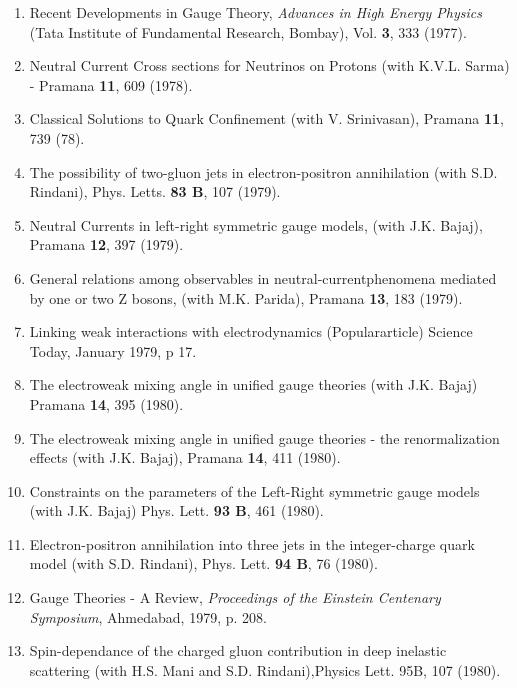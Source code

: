 \begin{enumerate}
\item Recent Developments in Gauge Theory, {\it Advances in High Energy
Physics} (Tata Institute of Fundamental Research, Bombay), 
Vol. {\bf 3}, 333 (1977).

\item Neutral Current Cross sections for Neutrinos on Protons (with
K.V.L. Sarma) - Pramana {\bf 11}, 609 (1978).

\item Classical Solutions to Quark Confinement (with V. Srinivasan), 
Pramana {\bf 11}, 739 (78).

\item The possibility of two-gluon jets in electron-positron
annihilation (with S.D. Rindani), Phys. Letts. {\bf 83 B}, 107 (1979).

\item Neutral Currents in left-right symmetric gauge models, (with J.K.
Bajaj), Pramana {\bf 12}, 397 (1979).

\item General relations among observables in neutral-current\break phenomena
mediated by one or two Z bosons, (with M.K. Parida), Pramana {\bf 13}, 
183 (1979).

\item Linking weak interactions with electrodynamics (Popular\break article)
Science Today, January 1979, p 17.

\item The electroweak mixing angle in unified gauge theories (with J.K.
Bajaj) Pramana {\bf 14}, 395 (1980).

\item The electroweak mixing angle in unified gauge theories - the
renormalization effects (with J.K. Bajaj), Pramana {\bf 14}, 411
(1980).

\item Constraints on the parameters of the Left-Right symme\-tric gauge
models (with J.K. Bajaj) Phys. Lett. {\bf 93 B}, 461 (1980).

\item Electron-positron annihilation into three jets in the
integer-charge quark model (with S.D. Rindani), Phys. Lett. {\bf 94 B}, 
76 (1980).

\item Gauge Theories - A Review, {\it Proceedings of the Einstein Centenary
Symposium}, Ahmedabad, 1979, p. 208.

\item Spin-dependance of the charged gluon contribution in deep
inelastic scattering (with H.S. Mani and S.D. Rindani),\break Physics Lett.
95B, 107 (1980).


\end{enumerate}
